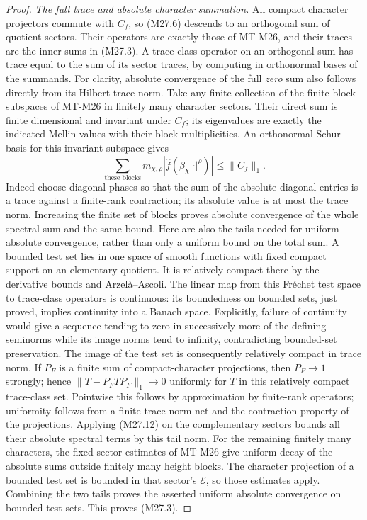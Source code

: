 \begin{proof}
\emph{The full trace and absolute character summation.}
All compact character projectors commute with
$C_f$, so (M27.6) descends to an orthogonal
sum of quotient sectors. Their operators are
exactly those of MT-M26, and their traces are
the inner sums in (M27.3). A trace-class operator
on an orthogonal sum has trace equal to the
sum of its sector traces, by computing in
orthonormal bases of the summands.
For clarity, absolute convergence of the full
\emph{zero} sum also follows directly from its
Hilbert trace norm. Take any finite collection
of the finite block subspaces of MT-M26 in
finitely many character sectors. Their direct
sum is finite dimensional and invariant under
$C_f$; its eigenvalues are exactly the indicated
Mellin values with their block multiplicities.
An orthonormal Schur basis for this invariant
subspace gives
\[
       \sum_{\text{these blocks}}m_{\chi,\rho}
            |\widehat f(\beta_\chi|\cdot|^\rho)|
                     \le\|C_f\|_1.
                                                               \tag{M27.12}
\]
Indeed choose diagonal phases so that the sum
of the absolute diagonal entries is a trace
against a finite-rank contraction; its absolute
value is at most the trace norm. Increasing the
finite set of blocks proves absolute convergence
of the whole spectral sum and the same bound.
Here are also the tails needed for uniform absolute
convergence, rather than only a uniform bound on the
total sum. A bounded test set lies in one space of
smooth functions with fixed compact support on an
elementary quotient. It is relatively compact there
by the derivative bounds and Arzel\`a--Ascoli.
The linear map from this Fr\'echet test space to
trace-class operators is continuous: its boundedness
on bounded sets, just proved, implies continuity
into a Banach space. Explicitly, failure of continuity
would give a sequence tending to zero in successively
more of the defining seminorms while its image norms
tend to infinity, contradicting bounded-set preservation.
The image of the test set is consequently relatively
compact in trace norm. If $P_F$ is a finite sum of
compact-character projections, then $P_F\to1$
strongly; hence
$\|T-P_FTP_F\|_1\to0$ uniformly for $T$ in this
relatively compact trace-class set. Pointwise this
follows by approximation by finite-rank operators;
uniformity follows from a finite trace-norm net and
the contraction property of the projections.
Applying (M27.12) on the complementary sectors bounds
all their absolute spectral terms by this tail norm.
For the remaining finitely many characters, the
fixed-sector estimates of MT-M26 give uniform
decay of the absolute sums outside finitely many
height blocks. The character projection of a
bounded test set is bounded in that sector's
$\mathcal E$, so those estimates apply. Combining
the two tails proves the asserted uniform absolute
convergence on bounded test sets.
This proves (M27.3).
\end{proof}

